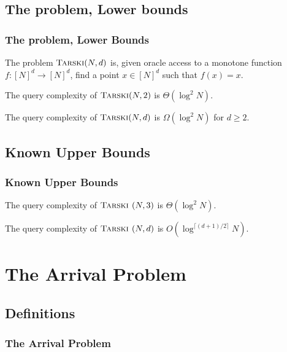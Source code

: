 \documentclass{beamer}
\begin{document}
\subsection{The problem, Lower bounds}

\begin{frame}
\frametitle{The problem, Lower Bounds}
    \begin{Definition}
        The problem $\textsc{Tarski}(N, d)$ is, given oracle access to a monotone function $f : [N]^d \to [N]^d$, find a point $x \in [N]^d$ such that
        $f(x) = x$.
    \end{Definition}
    \begin{Theorem}
        The query complexity of $\textsc{Tarski}(N, 2)$ is $\Theta(\log^2 N)$.
    \end{Theorem}
    \begin{Corollary}
        The query complexity of $\textsc{Tarski}(N, d)$ is $\Omega(\log^2 N)$ for $d \geq 2$.
    \end{Corollary}
\end{frame}


\newcommand{\trsk}{\textsc{Tarski }}

\subsection{Known Upper Bounds}
\begin{frame}
\frametitle{Known Upper Bounds}

\begin{Theorem}
    The query complexity of $\trsk(N, 3)$ is $\Theta(\log^2 N)$.
\end{Theorem}
\begin{Theorem}[Chen, Li]
    The query complexity of $\trsk(N, d)$ is $O(\log^{\lceil (d+1) / 2 \rceil} N)$.
\end{Theorem}

\end{frame}


\section{The Arrival Problem}
\subsection{Definitions}
\begin{frame}
\frametitle{The Arrival Problem}
    
    
\end{frame}
\end{document}
